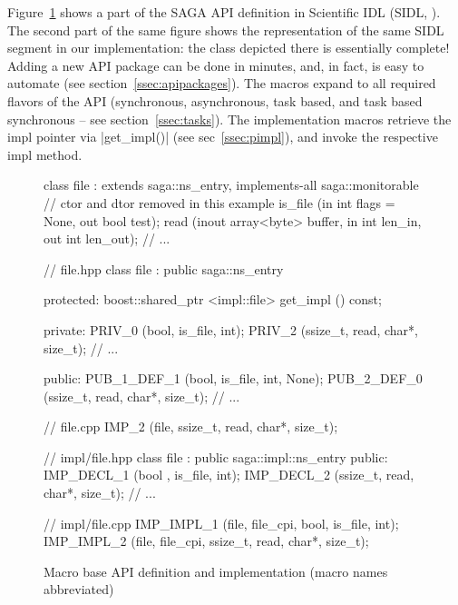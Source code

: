 Figure~\ref{src:sidl} shows a part of the SAGA API definition in
Scientific IDL (SIDL, \cite{sidl}).  The second part of the same
figure shows the representation of the same SIDL segment in our
implementation: the class depicted there is essentially complete!  Adding
a new API package can be done in minutes, and, in fact, is easy to
automate (see section~\ref{ssec:apipackages}).  The macros expand to all
required flavors of the API (synchronous, asynchronous, task based, and 
task based synchronous -- see
section~\ref{ssec:tasks}).  The implementation macros retrieve the impl
pointer via |get_impl()| (see sec~\ref{ssec:pimpl}), and invoke the
respective impl method.  

\begin{figure}[!ht]
 \begin{center}
  \begin{mycode}[label=saga::file in SIDL]
  class file : extends         saga::ns_entry,
               implements-all  saga::monitorable
  {
    // ctor and dtor removed in this example
    is_file     (in  int            flags = None,
                 out bool           test);
    read        (inout array<byte>  buffer,
                 in    int          len_in,
                 out   int          len_out);
  // ...
  }
  \end{mycode}
  \begin{mycode}[label=saga::file in C++ Macros, firstnumber=last]
  // file.hpp
  class file 
    : public saga::ns_entry
  {
    protected:
      boost::shared_ptr <impl::file> get_impl () const;

    private:
      PRIV_0      (bool,    is_file, int);
      PRIV_2      (ssize_t, read,    char*, size_t);
  // ...

    public:
      PUB_1_DEF_1 (bool,    is_file, int,   None);
      PUB_2_DEF_0 (ssize_t, read,    char*, size_t);
  // ...
  }

  // file.cpp
  IMP_2 (file, ssize_t, read, char*, size_t);
  \end{mycode}
  \begin{mycode}[label=saga::impl::file in C++ Macros, firstnumber=last]
  // impl/file.hpp
  class file 
    : public saga::impl::ns_entry
  {
    public:
      IMP_DECL_1 (bool   , is_file, int);
      IMP_DECL_2 (ssize_t, read,    char*, size_t);
  // ...
  }
  
  // impl/file.cpp
  IMP_IMPL_1 (file, file_cpi, bool, is_file, int);
  IMP_IMPL_2 (file, file_cpi, ssize_t, read, char*, 
              size_t);
  \end{mycode}
  \up
  \up
  \caption{\label{src:sidl}
    Macro base API definition and implementation (macro names 
    abbreviated)}
 \end{center}
\end{figure}


